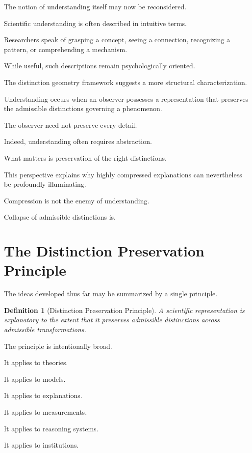 \documentclass[11pt,oneside,openany]{book}
\newtheorem{definition}{Definition}[chapter] \newtheorem{theorem}{Theorem}[chapter] \newtheorem{proposition}{Proposition}[chapter] \newtheorem{lemma}{Lemma}[chapter] \newtheorem{corollary}{Corollary}[chapter] \newtheorem{remark}{Remark}[chapter]
\begin{document}
The notion of understanding itself may now be reconsidered.

Scientific understanding is often described in intuitive terms.

Researchers speak of grasping a concept, seeing a connection, recognizing a pattern, or comprehending a mechanism.

While useful, such descriptions remain psychologically oriented.

The distinction geometry framework suggests a more structural characterization.

Understanding occurs when an observer possesses a representation that preserves the admissible distinctions governing a phenomenon.

The observer need not preserve every detail.

Indeed, understanding often requires abstraction.

What matters is preservation of the right distinctions.

This perspective explains why highly compressed explanations can nevertheless be profoundly illuminating.

Compression is not the enemy of understanding.

Collapse of admissible distinctions is.

\section{The Distinction Preservation Principle}

The ideas developed thus far may be summarized by a single principle.

\begin{definition}[Distinction Preservation Principle]

A scientific representation is explanatory to the extent that it preserves admissible distinctions across admissible transformations.

\end{definition}

The principle is intentionally broad.

It applies to theories.

It applies to models.

It applies to explanations.

It applies to measurements.

It applies to reasoning systems.

It applies to institutions.
\end{document}

